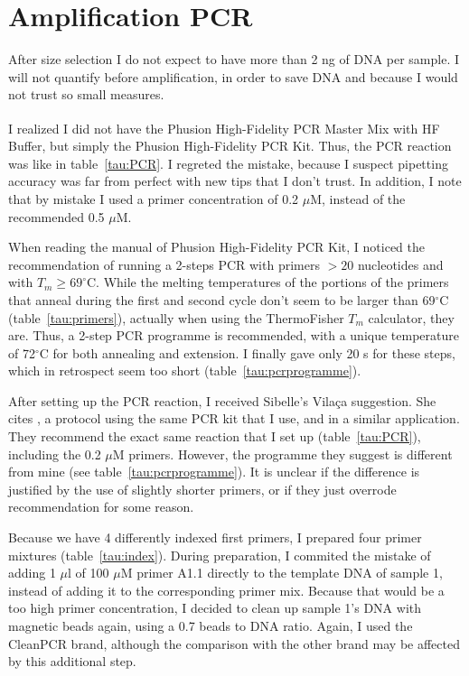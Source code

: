 \documentclass[a4paper,12pt]{article}
\begin{document}
\section{Amplification PCR}
After size selection I do not expect to have more than 2 ng of DNA per sample. I will not quantify before amplification, in order to save DNA and because I would not trust so small measures.

I realized I did not have the Phusion\textsuperscript{\textregistered} High-Fidelity PCR Master Mix with HF Buffer, but simply the Phusion High-Fidelity PCR Kit. Thus, the PCR reaction was like in table~\ref{tau:PCR}. I regreted the mistake, because I suspect pipetting accuracy was far from perfect with new tips that I don't trust. In addition, I note that by mistake I used a primer concentration of 0.2 $\mu$M, instead of the recommended 0.5 $\mu$M.

When reading the manual of Phusion High-Fidelity PCR Kit, I noticed the recommendation of running a 2-steps PCR with primers $>20$ nucleotides and with $T_m \ge 69^\circ$C. While the melting temperatures of the portions of the primers that anneal during the first and second cycle don't seem to be larger than 69$^\circ$C (table~\ref{tau:primers}), actually when using the ThermoFisher $T_m$ calculator, they are. Thus, a 2-step PCR programme is recommended, with a unique temperature of 72$^\circ$C for both annealing and extension. I finally gave only 20 s for these steps, which in retrospect seem too short (table~\ref{tau:pcrprogramme}).

After setting up the PCR reaction, I received Sibelle's Vilaça suggestion. She cites \citet{Meyer2010}, a protocol using the same PCR kit that I use, and in a similar application. They recommend the exact same reaction that I set up (table~\ref{tau:PCR}), including the 0.2 $\mu$M primers. However, the programme they suggest is different from mine (see table~\ref{tau:pcrprogramme}). It is unclear if the difference is justified by the use of slightly shorter primers, or if they just overrode \citet{Meyer2010} recommendation for some reason.

Because we have 4 differently indexed first primers, I prepared four primer mixtures (table~\ref{tau:index}). During preparation, I commited the mistake of adding 1 $\mu$l of 100 $\mu$M primer A1.1 directly to the template DNA of sample 1, instead of adding it to the corresponding primer mix. Because that would be a too high primer concentration, I decided to clean up sample 1's DNA with magnetic beads again, using a 0.7 beads to DNA ratio. Again, I used the CleanPCR brand, although the comparison with the other brand may be affected by this additional step.
\end{document}
